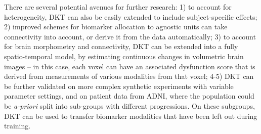 \documentclass{llncs}
\begin{document}
There are several potential avenues for further research: 1) to account for heterogeneity, DKT can also be easily extended to include subject-specific effects; 2) improved schemes for biomarker allocation to agnostic units can take connectivity into account, or derive it from the data automatically; 3) to account for brain morphometry and connectivity, DKT can be extended into a fully spatio-temporal model, by estimating continuous changes in volumetric brain images -- in this case, each voxel can have an associated dysfunction score that is derived from measurements of various modalities from that voxel; 4-5) DKT can be further validated on more complex synthetic experiments with variable parameter settings, and on patient data from ADNI, where the population could be \emph{a-priori} split into sub-groups with different progressions. On these subgroups, DKT can be used to transfer biomarker modalities that have been left out during training.

%
\end{document}
